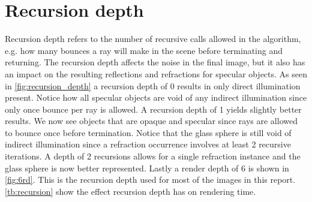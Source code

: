 \documentclass[a4paper, 12pt]{report}
\begin{document}
\section{Recursion depth}
Recursion depth refers to the number of recursive calls allowed in the algorithm, e.g. how many bounces a ray will make in the scene before terminating and returning. 
The recursion depth affects the noise in the final image, but it also has an impact on the resulting reflections and refractions for specular objects.
As seen in \autoref{fig:recursion_depth} a recursion depth of 0 results in only direct illumination present.
Notice how all specular objects are void of any indirect illumination since only once bounce per ray is allowed. 
A recursion depth of 1 yields slightly better results.
We now see objects that are opaque and specular since rays are allowed to bounce once before termination.
Notice that the glass sphere is still void of indirect illumination since a refraction occurrence involves at least 2 recursive iterations.
A depth of 2 recursions allows for a single refraction instance and the glass sphere is now better represented.
Lastly a render depth of 6 is shown in \autoref{fig:6rd}. 
This is the recursion depth used for most of the images in this report.
\autoref{tb:recursion} show the effect recursion depth has on rendering time.
\end{document}
